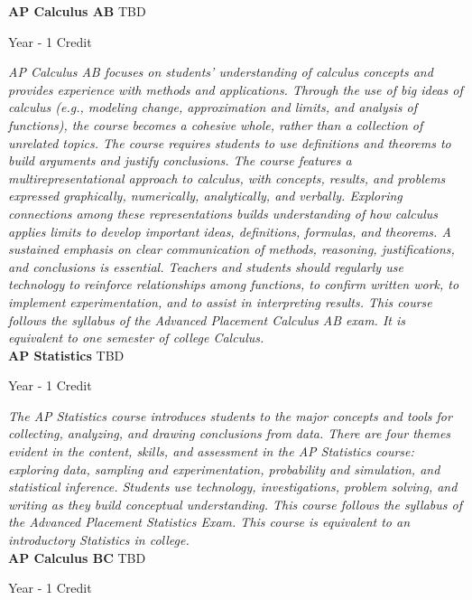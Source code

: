 \noindent\textbf{AP Calculus AB} \hfill TBD

\noindent Year - 1 Credit

\vspace{1mm}\emph{AP Calculus AB focuses on students’ understanding of calculus concepts and provides experience with methods and applications. Through the use of big ideas of calculus (e.g., modeling change, approximation and limits, and analysis of functions), the course becomes a cohesive whole, rather than a collection of unrelated topics. The course requires students to use definitions and theorems to build arguments and justify conclusions. The course features a multirepresentational approach to calculus, with concepts, results, and problems expressed graphically, numerically, analytically, and verbally. Exploring connections among these representations builds understanding of how calculus applies limits to develop important ideas, definitions, formulas, and theorems. A sustained emphasis on clear communication of methods, reasoning, justifications, and conclusions is essential. Teachers and students should regularly use technology to reinforce relationships among functions, to confirm written work, to implement experimentation, and to assist in interpreting results. This course follows the syllabus of the Advanced Placement Calculus AB exam. It is equivalent to one semester of college Calculus.}\\


\noindent\textbf{AP Statistics} \hfill TBD

\noindent Year - 1 Credit

\vspace{1mm}\emph{The AP Statistics course introduces students to the major concepts and tools for collecting, analyzing, and drawing conclusions from data. There are four themes evident in the content, skills, and assessment in the AP Statistics course: exploring data, sampling and experimentation, probability and simulation, and statistical inference. Students use technology, investigations, problem solving, and writing as they build conceptual understanding. This course follows the syllabus of the Advanced Placement Statistics Exam. This course is equivalent to an introductory Statistics in college.}\\


\noindent\textbf{AP Calculus BC} \hfill TBD

\noindent Year - 1 Credit

